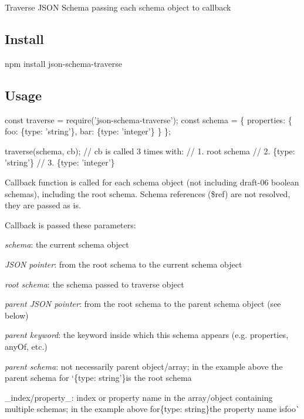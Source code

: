 Traverse J\+S\+ON Schema passing each schema object to callback

\href{https://travis-ci.org/epoberezkin/json-schema-traverse}{\tt } \href{https://www.npmjs.com/package/json-schema-traverse}{\tt } \href{https://coveralls.io/github/epoberezkin/json-schema-traverse?branch=master}{\tt }

\subsection*{Install}


\begin{DoxyCode}
npm install json-schema-traverse
\end{DoxyCode}


\subsection*{Usage}


\begin{DoxyCode}
const traverse = require('json-schema-traverse');
const schema = \{
  properties: \{
    foo: \{type: 'string'\},
    bar: \{type: 'integer'\}
  \}
\};

traverse(schema, cb);
// cb is called 3 times with:
// 1. root schema
// 2. \{type: 'string'\}
// 3. \{type: 'integer'\}
\end{DoxyCode}


Callback function is called for each schema object (not including draft-\/06 boolean schemas), including the root schema. Schema references (\$ref) are not resolved, they are passed as is.

Callback is passed these parameters\+:


\begin{DoxyItemize}
\item {\itshape schema}\+: the current schema object
\item {\itshape J\+S\+ON pointer}\+: from the root schema to the current schema object
\item {\itshape root schema}\+: the schema passed to {\ttfamily traverse} object
\item {\itshape parent J\+S\+ON pointer}\+: from the root schema to the parent schema object (see below)
\item {\itshape parent keyword}\+: the keyword inside which this schema appears (e.\+g. {\ttfamily properties}, {\ttfamily any\+Of}, etc.)
\item {\itshape parent schema}\+: not necessarily parent object/array; in the example above the parent schema for `\{type\+: \textquotesingle{}string'\}{\ttfamily is the root schema}
\item {\ttfamily \+\_\+index/property\+\_\+\+: index or property name in the array/object containing multiple schemas; in the example above for}\{type\+: \textquotesingle{}string\textquotesingle{}\}{\ttfamily the property name is}\textquotesingle{}foo\textquotesingle{}\`{}
\end{DoxyItemize}

